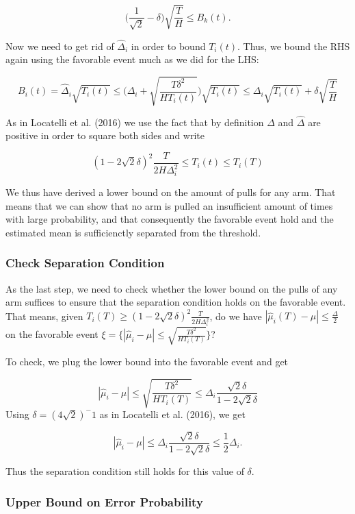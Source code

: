 \documentclass[12pt,]{article}
\begin{document}
\[
\Big( \frac{1}{\sqrt{2}} - \delta \Big) \sqrt{\frac{T}{H}} \leq B_k(t).
\]

Now we need to get rid of \(\hat{\Delta}_i\) in order to bound
\(T_i(t)\). Thus, we bound the RHS again using the favorable event much
as we did for the LHS:

\[
B_i(t) = \hat{\Delta}_i \sqrt{T_i(t)} \leq \Big(\Delta_i + \sqrt{\frac{T\delta^2}{HT_i(t)}}\Big) \sqrt{T_i(t)} \leq \Delta_i \sqrt{T_i(t)} + \delta \sqrt{\frac{T}{H}}
\]

As in Locatelli et al. (2016) we use the fact that by definition
\(\Delta\) and \(\hat{\Delta}\) are positive in order to square both
sides and write

\[
(1 - 2\sqrt{2}\delta)^2 \frac{T}{2H\Delta^2_i} \leq T_i(t) \leq T_i(T)
\]

We thus have derived a lower bound on the amount of pulls for any arm.
That means that we can show that no arm is pulled an insufficient amount
of times with large probability, and that consequently the favorable
event hold and the estimated mean is sufficienctly separated from the
threshold.

\subsubsection{Check Separation
Condition}\label{check-separation-condition}

As the last step, we need to check whether the lower bound on the pulls
of any arm suffices to ensure that the separation condition holds on the
favorable event. That means, given
\(T_i(T) \geq (1-2\sqrt{2}\delta)^2 \frac{T}{2H\Delta_i^2}\), do we have
\(|\hat{\mu}_i(T) - \mu | \leq \frac{\Delta}{2}\) on the favorable event
\(\xi = \Big\{|\hat{\mu}_i - \mu | \leq \sqrt{\frac{T\delta^2}{H T_i(T)}}\Big\}\)?

To check, we plug the lower bound into the favorable event and get

\[
|\hat{\mu}_i - \mu | \leq \sqrt{\frac{T\delta^2}{H T_i(T)}} \leq \Delta_i \frac{\sqrt{2}\delta}{1-2\sqrt{2}\delta}
\] Using \(\delta = (4\sqrt{2})^-1\) as in Locatelli et al. (2016), we
get

\[
|\hat{\mu}_i - \mu | \leq \Delta_i \frac{\sqrt{2}\delta}{1-2\sqrt{2}\delta} \leq \frac{1}{2}\Delta_i.
\]

Thus the separation condition still holds for this value of \(\delta\).

\subsubsection{Upper Bound on Error
Probability}\label{upper-bound-on-error-probability}
\end{document}
